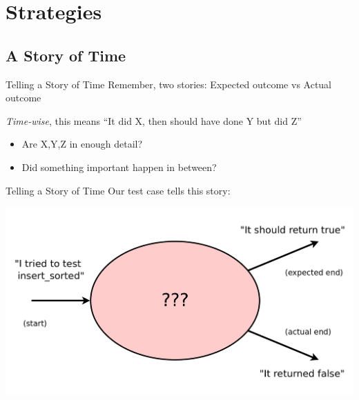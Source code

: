 \documentclass[xcolor=dvipsnames]{beamer}
\begin{document}
\section{Strategies}

\subsection{A Story of Time}


\begin{frame}{Telling a Story of Time}
	Remember, two stories: Expected outcome vs Actual outcome

	\linegap
	{\em Time-wise}, this means ``It did X, then should have done Y but did Z''
	\begin{itemize}
		\item Are X,Y,Z in enough detail?
		\item Did something important happen in between?
	\end{itemize}
\end{frame}

\begin{frame}{Telling a Story of Time}
	Our test case tells this story:

	\includegraphics[width=\textwidth]{time0.png}
\end{frame}
\end{document}
